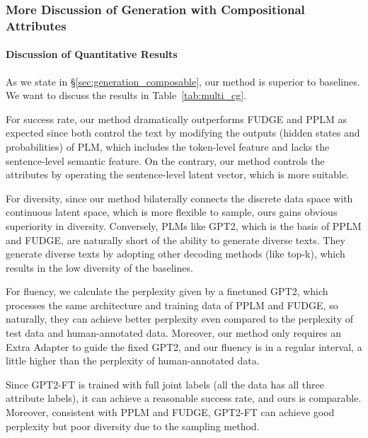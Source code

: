 \documentclass[11pt]{article}
\begin{document}
\subsubsection{More Discussion of Generation with Compositional Attributes}
\label{app:generation_compositional}
\paragraph{Discussion of Quantitative Results}
As we state in \S\ref{sec:generation_composable}, our method is superior to baselines. We want to discuss the results in Table~\ref{tab:multi_cg}.

For success rate, our method dramatically outperforms FUDGE and PPLM as expected since both control the text by modifying the outputs (hidden states and probabilities) of PLM, which includes the token-level feature and lacks the sentence-level semantic feature. On the contrary, our method controls the attributes by operating the sentence-level latent vector, which is more suitable. 

For diversity, since our method bilaterally connects the discrete data space with continuous latent space, which is more flexible to sample, ours gains obvious superiority in diversity. Conversely, PLMs like GPT2, which is the basis of PPLM and FUDGE, are naturally short of the ability to generate diverse texts. They generate diverse texts by adopting other decoding methods (like top-k), which results in the low diversity of the baselines. 

For fluency, we calculate the perplexity given by a finetuned GPT2, which processes the same architecture and training data of PPLM and FUDGE, so naturally, they can achieve better perplexity even compared to the perplexity of test data and human-annotated data. Moreover, our method only requires an Extra Adapter to guide the fixed GPT2, and our fluency is in a regular interval, a little higher than the perplexity of human-annotated data.

Since GPT2-FT is trained with full joint labels (all the data has all three attribute labels), it can achieve a reasonable success rate, and ours is comparable. Moreover, consistent with PPLM and FUDGE, GPT2-FT can achieve good perplexity but poor diversity due to the sampling method.
\end{document}
